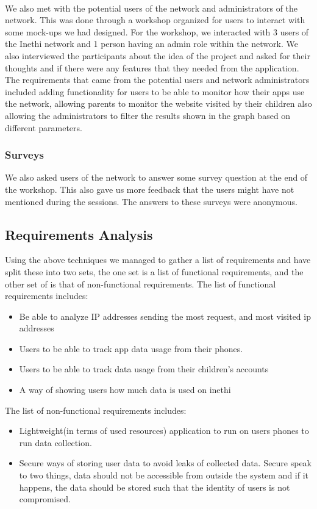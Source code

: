 \paragraph{}
We also met with the potential users of the network and administrators of the network.
This was done through a workshop organized for users to interact with some mock-ups we had designed.
For the workshop, we interacted with 3 users of the Inethi network and 1 person having an admin role within the network.
We also interviewed the participants about the idea of the project and asked for their thoughts and if there were any features that they needed from the application.
The requirements that came from the potential users and network administrators included adding functionality for users to be able to monitor how their apps use the network, allowing parents to monitor the website visited by their children also allowing the administrators to filter the results shown in the graph based on different parameters.
\subsubsection{Surveys}
We also asked users of the network to answer some survey question at the end of the workshop.
This also gave us more feedback that the users might have not mentioned during the sessions.
The answers to these surveys were anonymous.
\subsection{Requirements Analysis}\label{subsec:requirements-analysis}
Using the above techniques we managed to gather a list of requirements and have split these into two sets, the one set is a list of functional requirements, and the other set of is that of non-functional requirements.
The list of functional requirements includes:
\begin{itemize}
   \item Be able to analyze IP addresses sending the most request, and most visited ip addresses
    \item Users to be able to track app data usage from their phones.
   \item Users to be able to track data usage from their children's accounts
    \item A way of showing users how much data is used on inethi
\end{itemize}
The list of non-functional requirements includes:
\begin{itemize}
    \item Lightweight(in terms of used resources) application to run on users phones to run data collection.
    \item Secure ways of storing user data to avoid leaks of collected data.
    Secure speak to two things, data should not be accessible from outside the system and if it happens, the data should be stored such that the identity of users is not compromised.
\end{itemize}


